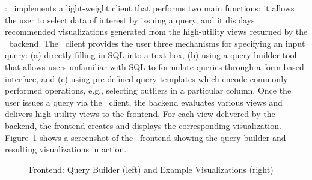 

:
\label{sec:SeeDB_frontend}
\SeeDB\ implements a light-weight client that performs two main functions: it
allows the user to select data of interest by issuing a query, 
and it displays recommended visualizations generated from the high-utility views 
returned by the \SeeDB\ backend.
The \SeeDB\ client provides the user three mechanisms for specifying an input query: 
(a) directly filling in SQL into a text box, 
(b) using a query builder tool that allows users
unfamiliar with SQL to formulate queries through a form-based interface, and (c)
using pre-defined query templates which encode commonly performed operations,
e.g., selecting outliers in a particular column. 
Once the user issues a query via the \SeeDB\ client, the backend
evaluates various views and delivers high-utility views to the frontend.
For each view delivered by the backend, the frontend creates and displays the 
corresponding visualization.
Figure~\ref{fig:frontend1} shows a screenshot of the \SeeDB\ frontend showing
the query builder and resulting visualizations in action.



 
\begin{figure}[htb]
\vspace{-15pt}
\centerline{
\hbox{}
\hbox{}}
\vspace{-15pt}
\caption{Frontend: Query Builder (left) and Example Visualizations
(right)}
\label{fig:frontend1}
\vspace{-10pt}
\end{figure} 


